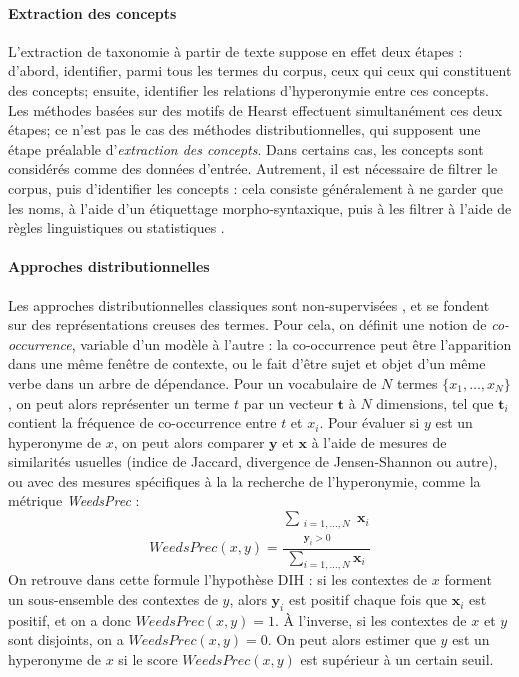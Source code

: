 \paragraph{Extraction des concepts}

L'extraction de taxonomie à partir de texte suppose en effet deux étapes : d'abord, identifier, parmi tous les termes du corpus, ceux qui ceux qui constituent des concepts; ensuite, identifier les relations d'hyperonymie entre ces concepts. Les méthodes basées sur des motifs de Hearst effectuent simultanément ces deux étapes; ce n'est pas le cas des méthodes distributionnelles, qui supposent une étape préalable d'\textit{extraction des concepts}. Dans certains cas, les concepts sont considérés comme des données d'entrée. %
Autrement, il est nécessaire de filtrer le corpus, puis d'identifier les concepts : cela consiste généralement à ne garder que les noms, à l'aide d'un étiquettage morpho-syntaxique, puis à les filtrer à l'aide de règles linguistiques ou statistiques \cite{shang2018automated}. %

\paragraph{Approches distributionnelles}

Les approches distributionnelles classiques sont non-supervisées \cite{weeds-etal-2004-characterising}, et se fondent sur des représentations creuses des termes. Pour cela, on définit une notion de \textit{co-occurrence}, variable d'un modèle à l'autre : la co-occurrence peut être l'apparition dans une même fenêtre de contexte, ou le fait d'être sujet et objet d'un même verbe dans un arbre de dépendance. Pour un vocabulaire de $N$ termes $\{x_1, \ldots, x_N\}$, on peut alors représenter un terme $t$ par un vecteur $\textbf{t}$ à $N$ dimensions, tel que $\textbf{t}_i$ contient la fréquence de co-occurrence entre $t$ et $x_i$. Pour évaluer si $y$ est un hyperonyme de $x$, on peut alors comparer $\textbf{y}$ et $\textbf{x}$ à l'aide de mesures de similarités usuelles (indice de Jaccard, divergence de Jensen-Shannon ou autre), ou avec des mesures spécifiques à la la recherche de l'hyperonymie, comme la métrique \textit{WeedsPrec} \cite{weeds-etal-2004-characterising} :
\begin{equation}
    WeedsPrec(x, y) = \frac{\displaystyle \sum_{\substack{i=1, \ldots, N \\ \textbf{y}_i > 0}} \textbf{x}_i}{\displaystyle \sum_{i =1, \ldots, N } \textbf{x}_i}
\end{equation}
On retrouve dans cette formule l'hypothèse DIH : si les contextes de $x$ forment un sous-ensemble des contextes de $y$, alors $\textbf{y}_i$ est positif chaque fois que $\textbf{x}_i$ est positif, et on a donc $WeedsPrec(x, y) = 1$. À l'inverse, si les contextes de $x$ et $y$ sont disjoints, on a $WeedsPrec(x, y) = 0$. On peut alors estimer que $y$ est un hyperonyme de $x$ si le score $WeedsPrec(x, y)$ est supérieur à un certain seuil.


